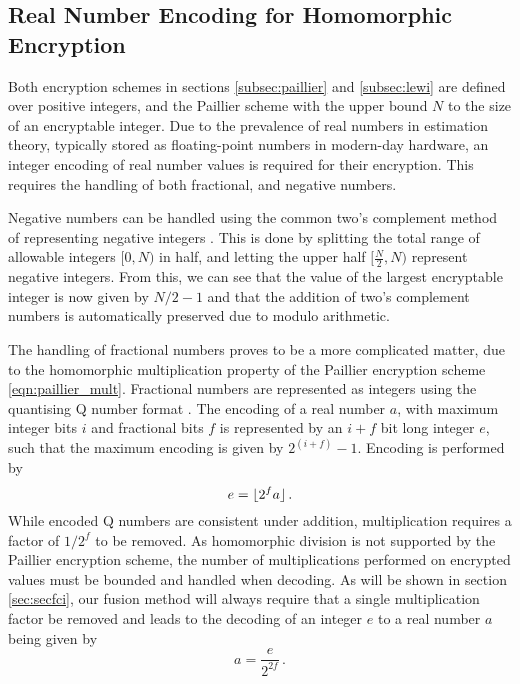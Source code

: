 \documentclass[letterpaper, 10 pt, conference]{ieeeconf}  %
\begin{document}
\subsection{Real Number Encoding for Homomorphic Encryption}
Both encryption schemes in sections \ref{subsec:paillier} and \ref{subsec:lewi} are defined over positive integers, and the Paillier scheme with the upper bound $N$ to the size of an encryptable integer. Due to the prevalence of real numbers in estimation theory, typically stored as floating-point numbers in modern-day hardware, an integer encoding of real number values is required for their encryption. This requires the handling of both fractional, and negative numbers. 

Negative numbers can be handled using the common two's complement method of representing negative integers \cite{liljaDesigningDigitalComputer2004}. This is done by splitting the total range of allowable integers $[0, N)$ in half, and letting the upper half $[\frac{N}{2}, N)$ represent negative integers. From this, we can see that the value of the largest encryptable integer is now given by $N/2-1$ and that the addition of two's complement numbers is automatically preserved due to modulo arithmetic.
   
The handling of fractional numbers proves to be a more complicated matter, due to the homomorphic multiplication property of the Paillier encryption scheme \eqref{eqn:paillier_mult}. Fractional numbers are represented as integers using the quantising Q number format \cite{oberstarFixedPointRepresentationFractional2007}. The encoding of a real number $a$, with maximum integer bits $i$ and fractional bits $f$ is represented by an $i+f$ bit long integer $e$, such that the maximum encoding is given by $2^{(i+f)}-1$. Encoding is performed by
\begin{equation}
   e = \lfloor{2^f a}\rfloor\,. \label{eqn:qmn}
\end{equation}
While encoded Q numbers are consistent under addition, multiplication requires a factor of $1/2^f$ to be removed. As homomorphic division is not supported by the Paillier encryption scheme, the number of multiplications performed on encrypted values must be bounded and handled when decoding. As will be shown in section \ref{sec:secfci}, our fusion method will always require that a single multiplication factor be removed and leads to the decoding of an integer $e$ to a real number $a$ being given by
\begin{equation}
   a = \frac{e}{2^{2f}}\,. \label{eqn:qmn_mult_decode}
\end{equation}
\end{document}
